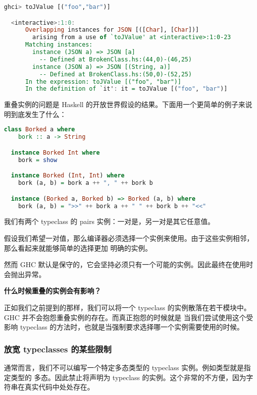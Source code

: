 \documentclass[./main.tex]{subfiles}
\begin{document}
\begin{lstlisting}[language=Haskell]
  ghci> toJValue [("foo","bar")]

  <interactive>:1:0:
      Overlapping instances for JSON [([Char], [Char])]
        arising from a use of `toJValue' at <interactive>:1:0-23
      Matching instances:
        instance (JSON a) => JSON [a]
          -- Defined at BrokenClass.hs:(44,0)-(46,25)
        instance (JSON a) => JSON [(String, a)]
          -- Defined at BrokenClass.hs:(50,0)-(52,25)
      In the expression: toJValue [("foo", "bar")]
      In the definition of `it': it = toJValue [("foo", "bar")]
\end{lstlisting}

重叠实例的问题是 Haskell 的开放世界假设的结果。下面用一个更简单的例子来说明到底发生了什么：

\begin{lstlisting}[language=Haskell]
  class Borked a where
    bork :: a -> String

  instance Borked Int where
    bork = show

  instance Borked (Int, Int) where
    bork (a, b) = bork a ++ ", " ++ bork b

  instance (Borked a, Borked b) => Borked (a, b) where
    bork (a, b) = ">>" ++ bork a ++ " " ++ bork b ++ "<<"
\end{lstlisting}

我们有两个 typeclass  的 pairs 实例：一对是，另一对是其它任意值。

假设我们希望一对值，那么编译器必须选择一个实例来使用。由于这些实例相邻，那么看起来就能够简单的选择更加
明确的实例。

然而 GHC 默认是保守的，它会坚持必须只有一个可能的实例。因此最终在使用时会抛出异常。

\begin{anote}
  \textbf{什么时候重叠的实例会有影响？}

  正如我们之前提到的那样，我们可以将一个 typeclass 的实例散落在若干模块中。GHC 并不会抱怨重叠实例的存在。而真正抱怨的时候就是
  当我们尝试使用这个受影响 typeclass 的方法时，也就是当强制要求选择哪一个实例需要使用的时候。
\end{anote}

\subsubsection*{放宽 typeclasses 的某些限制}

通常而言，我们不可以编写一个特定多态类型的 typeclass 实例。例如\acode{[Char]}类型就是\acode{[a]}指定类型的
多态。因此禁止将\acode{[Char]}声明为 typeclass 的实例。这个非常的不方便，因为字符串在真实代码中处处存在。
\end{document}
